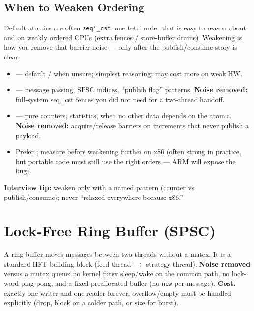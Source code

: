 \subsection{When to Weaken Ordering}
\label{subsec:when-to-weaken-ordering}
Default atomics are often \texttt{seq\char`_cst}: one total order that is easy to reason about 
and  on weakly ordered CPUs (extra fences / store-buffer drains). 
Weakening is how you remove that barrier noise --- only after the publish/consume story is clear.
\begin{itemize}
    \item {} --- default / when unsure; simplest reasoning; may cost more on weak HW.
    \item {} --- message passing, SPSC indices, ``publish flag'' patterns.
          \textbf{Noise removed:} full-system seq\_cst fences you did not need for a two-thread handoff.
    \item {} --- pure counters, statistics, when no other data depends on the atomic.
          \textbf{Noise removed:} acquire/release barriers on increments that never publish a payload.
    \item Prefer ; measure before weakening further on x86 (often strong in practice, 
          but portable code must still use the right orders --- ARM will expose the bug).
\end{itemize}
\par\noindent\textbf{Interview tip:} weaken only with a named pattern (counter vs publish/consume); 
never ``relaxed everywhere because x86.''

\section{Lock-Free Ring Buffer (SPSC)}
\label{sec:spsc-ring-buffer}
A  ring buffer moves messages between two threads 
without a mutex. It is a standard HFT building block (feed thread $\rightarrow$ strategy thread).
\newline
\textbf{Noise removed} versus a mutex queue: no kernel futex sleep/wake on the common path, 
no lock-word ping-pong, and a fixed preallocated buffer (no \texttt{new} per message). 
\textbf{Cost:} exactly one writer and one reader forever; overflow/empty must be handled 
explicitly (drop, block on a colder path, or size for burst).

